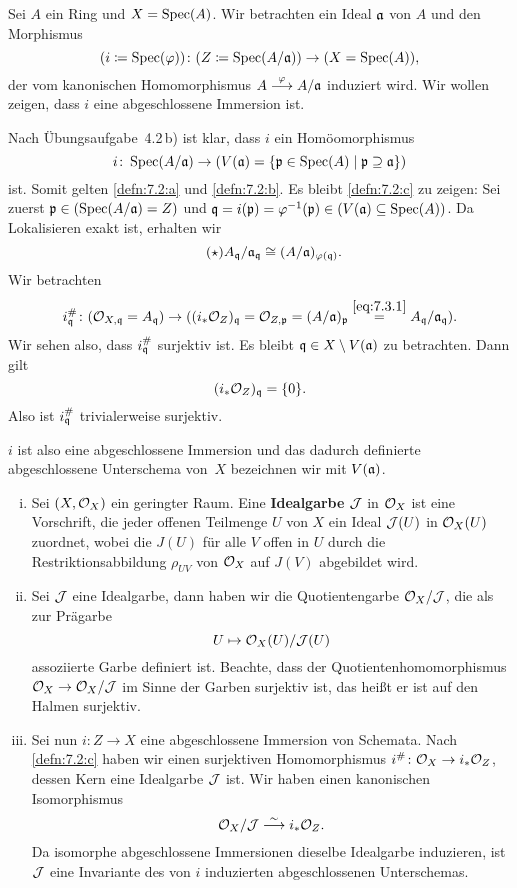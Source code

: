 \begin{kons}
\label{kons:7.3}
	Sei $A$ ein Ring und $X = \operatorname{Spec}(A)$. Wir betrachten ein Ideal $\mathfrak{a}$ von $A$ und den Morphismus
	\[
		(i\coloneqq\operatorname{Spec}(\varphi))\colon (Z\coloneqq \operatorname{Spec}(A/\mathfrak{a})) \to (X=\operatorname{Spec}(A)),
	\]
	der vom kanonischen Homomorphismus $A \overset{\varphi}{\longrightarrow}A/\mathfrak{a}$ induziert wird. Wir wollen zeigen, dass $i$ eine abgeschlossene Immersion ist.

	Nach Übungsaufgabe~4.2\,b) ist klar, dass $i$ ein Homöomorphismus
	\[
		i \colon \operatorname{Spec}(A/\mathfrak{a}) \to (V(\mathfrak{a})=\{\mathfrak{p} \in \operatorname{Spec}(A) \mid \mathfrak{p} \supseteq \mathfrak{a}\})
	\]
	ist. Somit gelten \ref{defn:7.2:a} und \ref{defn:7.2:b}. Es bleibt \ref{defn:7.2:c} zu zeigen: Sei zuerst $\mathfrak{p} \in (\operatorname{Spec}(A/\mathfrak{a}) = Z)$ und $\mathfrak{q} = i(\mathfrak{p}) = \varphi^{-1}(\mathfrak{p})\in (V(\mathfrak{a}) \subseteq \operatorname{Spec}(A))$. Da Lokalisieren exakt ist, erhalten wir
	\begin{equation*}
	\label{eq:7.3.1}\tag{$\star$}
		A_{\mathfrak{q}}/\mathfrak{a}_{\mathfrak{q}} \cong (A/\mathfrak{a})_{\varphi(\mathfrak{q})}.
	\end{equation*}
	Wir betrachten
	\[
		i_{\mathfrak{q}}^{\#}\colon (\mathcal{O}_{X,\mathfrak{q}} = A_{\mathfrak{q}}) \to ((i_*\mathcal{O}_Z)_{\mathfrak{q}} = \mathcal{O}_{Z,\mathfrak{p}} = (A/\mathfrak{a})_{\mathfrak{p}} \overset{\eqref{eq:7.3.1}}{=} A_{\mathfrak{q}}/\mathfrak{a}_{\mathfrak{q}}).
	\]
	Wir sehen also, dass $i_{\mathfrak{q}}^{\#}$ surjektiv ist. Es bleibt $\mathfrak{q} \in X \setminus V(\mathfrak{a})$ zu betrachten. Dann gilt
	\[
		(i_*\mathcal{O}_Z)_{\mathfrak{q}} = \{0\}.
	\]
	Also ist $i_{\mathfrak{q}}^{\#}$ trivialerweise surjektiv.

	$i$ ist also eine abgeschlossene Immersion und das dadurch definierte abgeschlossene Unterschema von~$X$ bezeichnen wir mit $V(\mathfrak{a})$.
\end{kons}

\begin{bem}
\label{bem:7.4}
	\begin{enumerate}[i)]
		\item Sei $(X,\mathcal{O}_X)$ ein geringter Raum. Eine \textbf{Idealgarbe} $\mathcal{J}$ in $\mathcal{O}_X$ ist eine Vorschrift, die jeder offenen Teilmenge $U$ von $X$ ein Ideal $\mathcal{J}(U)$ in $\mathcal{O}_X(U)$ zuordnet, wobei die $J(U)$ für alle $V$ offen in $U$ durch die Restriktionsabbildung $\rho_{UV}$ von $\mathcal{O}_X$ auf $J(V)$ abgebildet wird.
		\item Sei $\mathcal{J}$ eine Idealgarbe, dann haben wir die Quotientengarbe $\mathcal{O}_X/\mathcal{J}$, die als zur Prägarbe
		\[
			U \mapsto \mathcal{O}_X(U)/\mathcal{J}(U)
		\]
		assoziierte Garbe definiert ist. Beachte, dass der Quotientenhomomorphismus $\mathcal{O}_X\to\mathcal{O}_X/\mathcal{J}$ im Sinne der Garben surjektiv ist, das heißt er ist auf den Halmen surjektiv.
		\item Sei nun $i \colon Z \to X$ eine abgeschlossene Immersion von Schemata. Nach \ref{defn:7.2:c} haben wir einen surjektiven Homomorphismus $i^{\#}\colon \mathcal{O}_X \to i_*\mathcal{O}_Z$, dessen Kern eine Idealgarbe $\mathcal{J}$ ist. Wir haben einen kanonischen Isomorphismus
		\[
			\mathcal{O}_X/\mathcal{J} \overset{\sim}{\longrightarrow} i_*\mathcal{O}_Z.
		\]
		Da isomorphe abgeschlossene Immersionen dieselbe Idealgarbe induzieren, ist $\mathcal{J}$ eine Invariante des von $i$ induzierten abgeschlossenen Unterschemas.
	\end{enumerate}
\end{bem}

